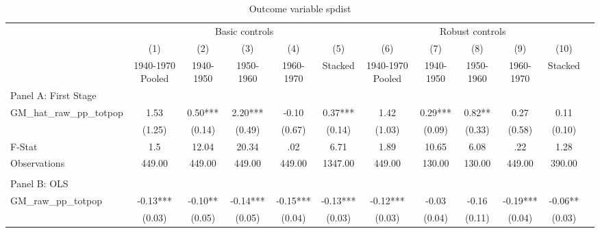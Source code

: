  \begin{table}[htbp]\centering {} \begin{threeparttable} \caption{Outcome variable spdist } \begin{tabular}{l*{11}{c}} \toprule
          &\multicolumn{5}{c}{Basic controls}                                   &\multicolumn{5}{c}{Robust controls}                                  \\\cmidrule(lr){2-6}\cmidrule(lr){7-11}
          &\multicolumn{1}{c}{(1)}&\multicolumn{1}{c}{(2)}&\multicolumn{1}{c}{(3)}&\multicolumn{1}{c}{(4)}&\multicolumn{1}{c}{(5)}&\multicolumn{1}{c}{(6)}&\multicolumn{1}{c}{(7)}&\multicolumn{1}{c}{(8)}&\multicolumn{1}{c}{(9)}&\multicolumn{1}{c}{(10)}\\
          &\multicolumn{1}{c}{1940-1970 Pooled}&\multicolumn{1}{c}{1940-1950}&\multicolumn{1}{c}{1950-1960}&\multicolumn{1}{c}{1960-1970}&\multicolumn{1}{c}{Stacked}&\multicolumn{1}{c}{1940-1970 Pooled}&\multicolumn{1}{c}{1940-1950}&\multicolumn{1}{c}{1950-1960}&\multicolumn{1}{c}{1960-1970}&\multicolumn{1}{c}{Stacked}\\
\cmidrule(lr){1-11}
\multicolumn{10}{l}{Panel A: First Stage}\\
\cmidrule(lr){1-11}
GM\_hat\_raw\_pp\_totpop&      1.53   &      0.50***&      2.20***&     -0.10   &      0.37***&      1.42   &      0.29***&      0.82** &      0.27   &      0.11   \\
          &    (1.25)   &    (0.14)   &    (0.49)   &    (0.67)   &    (0.14)   &    (1.03)   &    (0.09)   &    (0.33)   &    (0.58)   &    (0.10)   \\
\midrule
F-Stat    &       1.5   &     12.04   &     20.34   &       .02   &      6.71   &      1.89   &     10.65   &      6.08   &       .22   &      1.28   \\
Observations&    449.00   &    449.00   &    449.00   &    449.00   &   1347.00   &    449.00   &    130.00   &    130.00   &    449.00   &    390.00   \\
\cmidrule[\heavyrulewidth](lr){1-11} \\ \cmidrule[\heavyrulewidth](lr){1-11}
\multicolumn{10}{l}{Panel B: OLS}\\
\cmidrule(lr){1-11}
GM\_raw\_pp\_totpop&     -0.13***&     -0.10** &     -0.14***&     -0.15***&     -0.13***&     -0.12***&     -0.03   &     -0.16   &     -0.19***&     -0.06** \\
          &    (0.03)   &    (0.05)   &    (0.05)   &    (0.04)   &    (0.03)   &    (0.03)   &    (0.04)   &    (0.11)   &    (0.04)   &    (0.03)   \\

\end{tabular}
\end{threeparttable}
\end{table}
